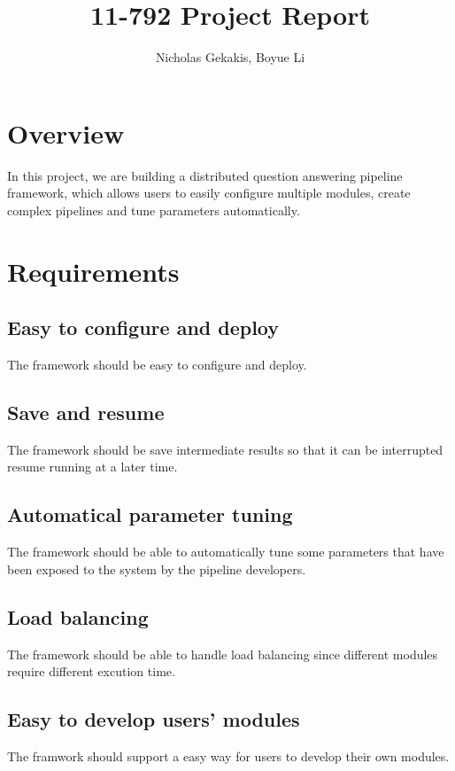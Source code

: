 \documentclass{article}
\begin{document}
\title{11-792 Project Report}
 
\author{Nicholas Gekakis, Boyue Li}
 
\maketitle
 
\section{Overview}

In this project, we are building a distributed question answering pipeline framework,
which allows users to easily configure multiple modules,
create complex pipelines and tune parameters automatically.

\section{Requirements}

    \subsection{Easy to configure and deploy}
    The framework should be easy to configure and deploy.

    \subsection{Save and resume}
    The framework should be save intermediate results so that it can be interrupted resume running at a later time.

    \subsection{Automatical parameter tuning}
    The framework should be able to automatically tune some parameters that have been exposed to the system by the pipeline developers.
    \subsection{Load balancing}
    The framework should be able to handle load balancing since different modules require different excution time.

    \subsection{Easy to develop users' modules}
    The framwork should support a easy way for users to develop their own modules.
\end{document}
